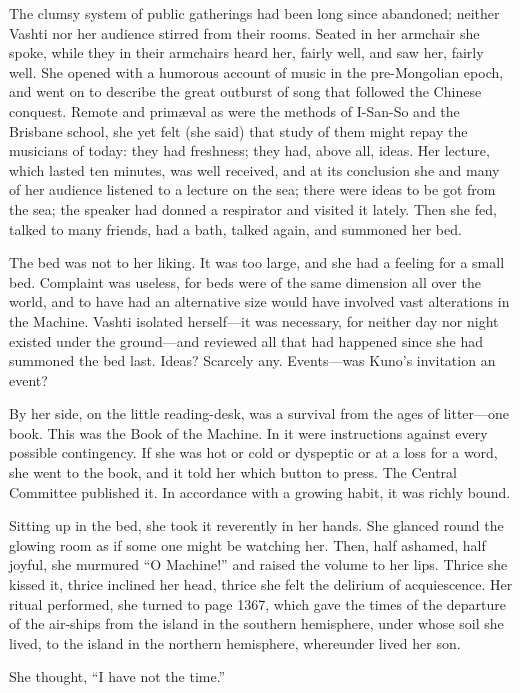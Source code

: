 The clumsy system of public gatherings had been long since abandoned; neither Vashti nor her audience stirred from their rooms. Seated in her armchair she spoke, while they in their armchairs heard her, fairly well, and saw her, fairly well. She opened with a humorous account of music in the pre-Mongolian epoch, and went on to describe the great outburst of song that followed the Chinese conquest. Remote and prim\ae val as were the methods of I-San-So and the Brisbane school, she yet felt (she said) that study of them might repay the musicians of today: they had freshness; they had, above all, ideas. Her lecture, which lasted ten minutes, was well received, and at its conclusion she and many of her audience listened to a lecture on the sea; there were ideas to be got from the sea; the speaker had donned a respirator and visited it lately. Then she fed, talked to many friends, had a bath, talked again, and summoned her bed.

The bed was not to her liking. It was too large, and she had a feeling for a small bed. Complaint was useless, for beds were of the same dimension all over the world, and to have had an alternative size would have involved vast alterations in the Machine. Vashti isolated herself---it was necessary, for neither day nor night existed under the ground---and reviewed all that had happened since she had summoned the bed last. Ideas? Scarcely any. Events---was Kuno's invitation an event?

By her side, on the little reading-desk, was a survival from the ages of litter---one book. This was the Book of the Machine. In it were instructions against every possible contingency. If she was hot or cold or dyspeptic or at a loss for a word, she went to the book, and it told her which button to press. The Central Committee published it. In accordance with a growing habit, it was richly bound.

Sitting up in the bed, she took it reverently in her hands. She glanced round the glowing room as if some one might be watching her. Then, half ashamed, half joyful, she murmured ``O Machine!'' and raised the volume to her lips. Thrice she kissed it, thrice inclined her head, thrice she felt the delirium of acquiescence. Her ritual performed, she turned to page 1367, which gave the times of the departure of the air-ships from the island in the southern hemisphere, under whose soil she lived, to the island in the northern hemisphere, whereunder lived her son.

She thought, ``I have not the time.''

